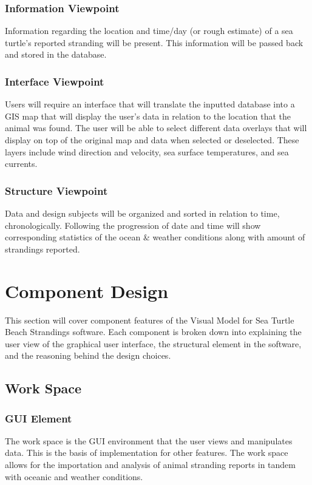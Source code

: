 \documentclass[onecolumn, draftclsnofoot,10pt, compsoc]{IEEEtran}
\begin{document}
\begin{singlespace}
    \subsubsection{Information Viewpoint}
    Information regarding the location and time/day (or rough estimate) of a sea turtle's reported stranding will be present. This information will be passed back and stored in the database.
    
    \subsubsection{Interface Viewpoint}
    Users will require an interface that will translate the inputted database into a GIS map that will display the user's data in relation to the location that the animal was found. The user will be able to select different data overlays that will display on top of the original map and data when selected or deselected. These layers include wind direction and velocity, sea surface temperatures, and sea currents.
    
    \subsubsection{Structure Viewpoint}
    Data and design subjects will be organized and sorted in relation to time, chronologically. Following the progression of date and time will show corresponding statistics of the ocean \& weather conditions along with amount of strandings reported.
    
\pagebreak
\section{Component Design}%
    This section will cover component features of the Visual Model for Sea Turtle Beach Strandings software.  Each component is broken down into explaining the user view of the graphical user interface, the structural element in the software, and the reasoning behind the design choices.
    \subsection{Work Space}
        \subsubsection{GUI Element}
        The work space is the GUI environment that the user views and manipulates data.  This is the basis of implementation for other features.  The work space allows for the importation and analysis of animal stranding reports in tandem with oceanic and weather conditions.


\end{singlespace}
\end{document}
